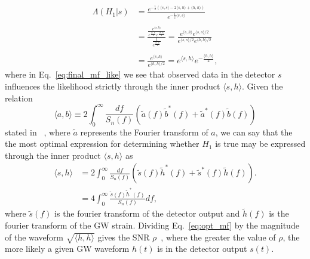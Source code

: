  \begin{align}
    \Lambda(H_1|s) &= \frac{e^{-\frac{1}{2}\left(\langle s,s\rangle -2\langle s,h\rangle +\langle h,h\rangle \right)}}
    {e^{-\frac{1}{2}\langle s,s\rangle }} \\
    \\
    &= \frac{\frac{e^{\langle s,h\rangle }}
    {e^{\frac{\langle s,s\rangle }{2}}e^{\frac{\langle h,h\rangle }{2}}}} 
    {\frac{1}{e^{\frac{\langle s,s\rangle }{2}}}} 
    = \frac{e^{\langle s,h\rangle } e^{\langle s,s\rangle /2}}
    {e^{\langle s,s\rangle /2}e^{\langle h,h\rangle /2}} \\
    \\
    &= \frac{e^{\langle s,h\rangle }}{e^{\langle h,h\rangle /2}}\label{eq:final_mf_like} 
    = e^{\langle s,h\rangle } e^{-\frac{\langle h,h\rangle}{2}},
 \end{align}
%
where in Eq.~\ref{eq:final_mf_like} we see that observed 
data in the detector $s$ influences the likelihood strictly  
through the inner product $\langle s,h\rangle$. Given the relation
%
\begin{equation}
    \langle a,b\rangle \equiv 2 \int_{0}^{\infty} \frac{df}{S_n(f)} 
    \left( \tilde{a}(f)\tilde{b}^{*}(f) + 
    \tilde{a}^{*}(f)\tilde{b}(f)\right)
\end{equation}
%
stated in ~\cite{Sathyaprakash2009}, where $\tilde{a}$ 
represents the Fourier transform of $a$,
we can say that the the most optimal expression for determining 
whether $H_1$ is true may be expressed through the inner product 
$\langle s,h\rangle$ as
%
\begin{align}
    \langle s,h\rangle &= 2 \int_{0}^{\infty} \frac{df}{S_n(f)} \left(
    \tilde{s}(f)\tilde{h}^{*}(f) + 
    \tilde{s}^{*}(f)\tilde{h}(f)\right). \\
    &= 4 \int_{0}^{\infty} \frac{\tilde{s}(f) \tilde{h}^{*}(f)}
    {S_{n}(f)} df,\label{eq:opt_mf} 
\end{align}
%
where $\tilde{s}(f)$ is the fourier transform of the detector output and  
$\tilde{h}(f)$ is the fourier transform of the \ac{GW} strain. Dividing 
Eq.~\ref{eq:opt_mf} by the magnitude of the waveform $\sqrt{\langle h,h\rangle }$ 
gives the \ac{SNR} $\rho$~\cite{PhysRevD.85.122006}, where the greater the 
value of $\rho$, the more likely a given \ac{GW} 
waveform $h(t)$ is in the detector output $s(t)$.

